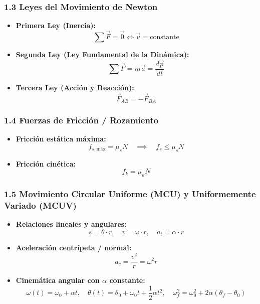 \documentclass[11pt,a4paper]{article}
\begin{document}
\subsubsection*{1.3 Leyes del Movimiento de Newton}

\begin{itemize}
  \item \textbf{Primera Ley (Inercia):}
  \[
    \sum \vec{F} = \vec{0} \iff \vec{v} = \text{constante}
  \]
  \item \textbf{Segunda Ley (Ley Fundamental de la Dinámica):}
  \[
    \sum \vec{F} = m \vec{a} = \frac{d\vec{p}}{dt}
  \]
  \item \textbf{Tercera Ley (Acción y Reacción):}
  \[
    \vec{F}_{AB} = -\vec{F}_{BA}
  \]
\end{itemize}

\subsubsection*{1.4 Fuerzas de Fricción / Rozamiento}

\begin{itemize}
  \item \textbf{Fricción estática máxima:}
  \[
    f_{s,\text{máx}} = \mu_s N \quad \implies \quad f_s \le \mu_s N
  \]
  \item \textbf{Fricción cinética:}
  \[
    f_k = \mu_k N
  \]
\end{itemize}

\subsubsection*{1.5 Movimiento Circular Uniforme (MCU) y Uniformemente Variado (MCUV)}

\begin{itemize}
  \item \textbf{Relaciones lineales y angulares:}
  \[
    s = \theta \cdot r, \quad v = \omega \cdot r, \quad a_t = \alpha \cdot r
  \]
  \item \textbf{Aceleración centrípeta / normal:}
  \[
    a_c = \frac{v^2}{r} = \omega^2 r
  \]
  \item \textbf{Cinemática angular con $\alpha$ constante:}
  \[
    \omega(t) = \omega_0 + \alpha t, \quad \theta(t) = \theta_0 + \omega_0 t + \frac{1}{2} \alpha t^2, \quad \omega_f^2 = \omega_0^2 + 2\alpha (\theta_f - \theta_0)
  \]
\end{itemize}
\end{document}
